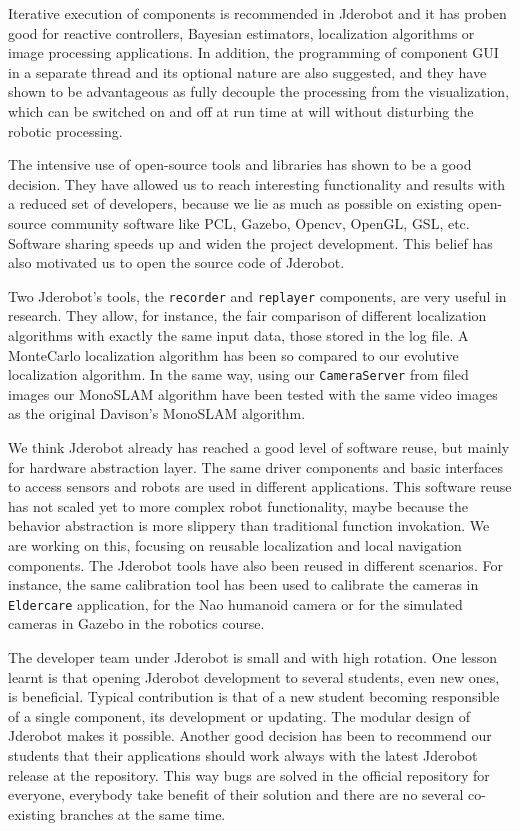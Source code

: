 \documentclass[twocolumn]{svjour3}          %
\begin{document}
Iterative execution of components is recommended in Jderobot and it has proben good for reactive controllers, Bayesian estimators, localization algorithms or image processing applications. In addition, the programming of component GUI in a separate thread and its optional nature are also suggested, and they have shown to be advantageous as fully decouple the processing from the visualization, which can be switched on and off at run time at will without disturbing the robotic processing.

The intensive use of open-source tools and libraries has shown to be a good decision. They have allowed us to reach interesting functionality and results with a reduced set of developers, because we lie as much as possible on existing open-source community software like PCL, Gazebo, Opencv, OpenGL, GSL, etc. Software sharing speeds up and widen the project development. This belief has also motivated us to open the source code of Jderobot.

Two Jderobot's tools, the \texttt{recorder} and \texttt{replayer} components, are very useful in research. They allow, for instance, the fair comparison of different localization algorithms with exactly the same input data, those stored in the log file. A MonteCarlo localization algorithm has been so compared to our evolutive localization algorithm. In the same way, using our \texttt{CameraServer} from filed images our MonoSLAM algorithm have been tested with the same video images as the original Davison's MonoSLAM algorithm.

We think Jderobot already has reached a good level of software reuse, but mainly for hardware abstraction layer. The same driver components and basic interfaces to access sensors and robots are used in different applications. This software reuse has not scaled yet to more complex robot functionality, maybe because the behavior abstraction is more slippery than traditional function invokation. We are working on this, focusing on reusable localization and local navigation components. The Jderobot tools have also been reused in different scenarios. For instance, the same calibration tool has been used to calibrate the cameras in \texttt{Eldercare} application, for the Nao humanoid camera or for the simulated cameras in Gazebo in the robotics course.

The developer team under Jderobot is small and with high rotation. One lesson learnt is that opening Jderobot development to several students, even new ones, is beneficial. Typical contribution is that of a new student becoming responsible of a single component, its development or updating. The modular design of Jderobot makes it possible. Another good decision has been to recommend our students that their applications should work always with the latest Jderobot release at the repository. This way bugs are solved in the official repository for everyone, everybody take benefit of their solution and there are no several co-existing branches at the same time.
\end{document}
